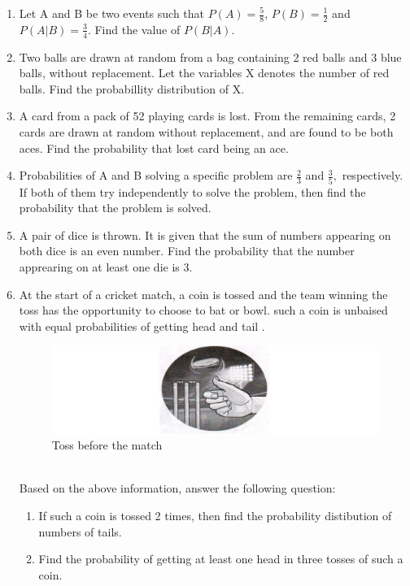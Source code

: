 \begin{enumerate}[label=\thesection.\arabic*.,ref=\thesection.\theenumi]
\item Let A and B be two events such that $P(A) = \frac{5}{8}$, $P(B) = \frac{1}{2}$ and  $P(A|B) = \frac{3}{4}$. Find the value of $P(B|A)$.
\item Two balls are drawn at random from a bag containing 2 red balls and 3 blue balls, without replacement. Let the variables X denotes the number of red balls. Find the probabillity distribution of X.
\item A card from a pack of 52 playing cards is lost. From the remaining cards, 2 cards are drawn at random without replacement, and are found to be both aces. Find the probability that lost card being an ace.
\item Probabilities of A and B solving a specific problem are $\frac{2}{3}$ and $\frac{3}{5},$ respectively. If both of them try independently to solve the problem, then find the probability that the problem is  solved.
\item A pair of dice is thrown. It is given that the sum of numbers  appearing on both dice is an even number. Find the probability that the number apprearing on at least one die is 3.
\item At the start of a cricket match, a coin is tossed and the team winning the toss has the opportunity to choose to bat or bowl. such a coin is unbaised with equal probabilities of getting head and tail  .
\begin{figure}[!ht]
\centering
\includegraphics[width=\columnwidth]{figs/coin}
\caption{Toss before the match}
\label{fig:coin1}
\end{figure}
\\ Based on the above information, answer the following question:
\begin{enumerate}
\item If such a coin is tossed 2 times, then find the probability distibution of numbers of tails.
\item Find the probability of getting at least one head in three tosses of such a coin.

\end{enumerate}
\end{enumerate}
